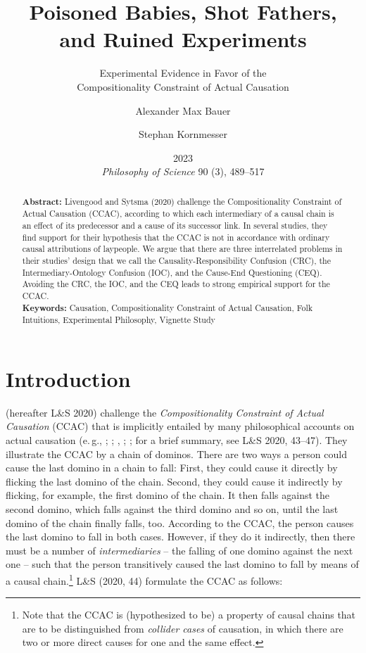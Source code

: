 \documentclass[egregdoesnotlikesansseriftitles,12pt]{scrartcl}
\title{Poisoned Babies, Shot Fathers,\\and Ruined Experiments}
\subtitle{Experimental Evidence in Favor of the\\Compositionality Constraint of Actual Causation}
\author[1*]{Alexander Max Bauer}
\author[1]{Stephan Kornmesser}
\affil[1]{ Department of Philosophy, University of Oldenburg}
\affil[*]{ Corresponding Author, E-Mail: \href{mailto:alexander.max.bauer@uni-oldenburg.de}{alexander.max.bauer@uni-oldenburg.de}}
\date{\small 2023\\\textit{Philosophy of Science} 90 (3), 489--517}
\begin{document}
\maketitle

\begin{abstract}
   \noindent\textbf{Abstract:} Livengood and Sytsma (2020) challenge the Compositionality Constraint of Actual Causation (CCAC), according to which each intermediary of a causal chain is an effect of its predecessor and a cause of its successor link. In several studies, they find support for their hypothesis that the CCAC is not in accordance with ordinary causal attributions of laypeople. We argue that there are three interrelated problems in their studies’ design that we call the Causality-Responsibility Confusion (CRC), the Intermediary-Ontology Confusion (IOC), and the Cause-End Questioning (CEQ). Avoiding the CRC, the IOC, and the CEQ leads to strong empirical support for the CCAC.\\[2ex]
   \textbf{Keywords:} Causation, Compositionality Constraint of Actual Causation, Folk Intuitions, Experimental Philosophy, Vignette Study\\[2ex]
\end{abstract}

\clearpage
\section{Introduction}\label{sec:introduction}
\citet{livengood_actual_2020} (hereafter L\&S 2020) challenge the \textit{Compositionality Constraint of Actual Causation} (CCAC) that is implicitly entailed by many philosophical accounts on actual causation (e.\,g., \cite{reichenbach_direction_1956}; \cite{salmon_causality_1994}; \cite{dowe_causality_1995}, \cite{ehring_causation_1997}; \cite{lewis_causation_1973,lewis_postscripts_1986}; for a brief summary, see L\&S 2020, 43--47). They illustrate the CCAC by a chain of dominos. There are two ways a person could cause the last domino in a chain to fall: First, they could cause it directly by flicking the last domino of the chain. Second, they could cause it indirectly by flicking, for example, the first domino of the chain. It then falls against the second domino, which falls against the third domino and so on, until the last domino of the chain finally falls, too. According to the CCAC, the person causes the last domino to fall in both cases. However, if they do it indirectly, then there must be a number of \textit{intermediaries} -- the falling of one domino against the next one -- such that the person transitively caused the last domino to fall by means of a causal chain.\footnote{Note that the CCAC is (hypothesized to be) a property of causal chains that are to be distinguished from \textit{collider cases} of causation, in which there are two or more direct causes for one and the same effect.} L\&S (2020, 44) formulate the CCAC as follows:
\end{document}

